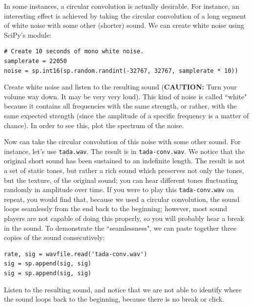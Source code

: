 In some instances, a circular convolution is actually desirable.
For instance, an interesting effect is achieved by taking the circular convolution of a long segment of white noise with some other (shorter) sound.
We can create white noise using SciPy's  module:
\begin{lstlisting}
# Create 10 seconds of mono white noise.
samplerate = 22050
noise = sp.int16(sp.random.randint(-32767, 32767, samplerate * 10))
\end{lstlisting}

\begin{problem}
Create white noise and listen to the resulting sound (\textbf{CAUTION:} Turn your volume way down. It may be very very loud).
This kind of noise is called ``white" because it contains all frequencies with the same strength, or rather, with the same expected strength (since the amplitude of a specific frequency is a matter of chance).
In order to see this, plot the spectrum of the noise.
\end{problem}

Now can take the circular convolution of this noise with some other sound.
For instance, let's use \texttt{tada.wav}.
The result is in \texttt{tada-conv.wav}.
We notice that the original short sound has been sustained to an indefinite length.
The result is not a set of static tones, but rather a rich sound which preserves not only the tones, but the texture, of the original sound; you can hear different tones fluctuating randomly in amplitude over time.
If you were to play this \texttt{tada-conv.wav} on repeat, you would find that, because we used a circular convolution, the sound loops seamlessly from the end back to the beginning; however, most sound players are not capable of doing this properly, so you will probably hear a break in the sound. To demonstrate the ``seamlessness", we can paste together three copies of the sound consecutively:

\begin{lstlisting}
rate, sig = wavfile.read('tada-conv.wav')
sig = sp.append(sig, sig)
sig = sp.append(sig, sig)
\end{lstlisting}

Listen to the resulting sound, and notice that we are not able to identify where the sound loops back to the beginning, because there is no break or click.


